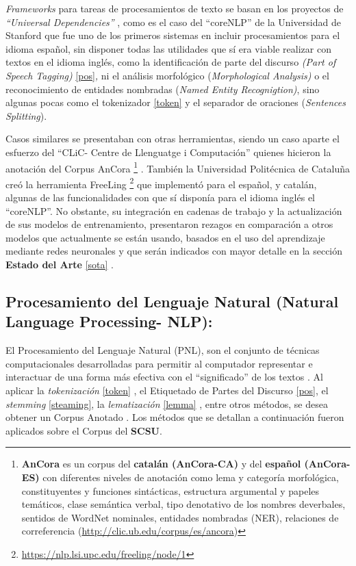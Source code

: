 \documentclass[
  12pt,
  openany]{book}
\begin{document}
\emph{Frameworks} para tareas de procesamientos de texto se basan en los proyectos de \emph{``Universal Dependencies''} \citep{demarneffe2021}, como es el caso del ``coreNLP'' de la Universidad de Stanford \citep{manning-etal-2014-stanford} que fue uno de los primeros sistemas en incluir procesamientos para el idioma español, sin disponer todas las utilidades que sí era viable realizar con textos en el idioma inglés, como la identificación de parte del discurso \emph{(Part of Speech Tagging)} \ref{pos}\emph{,} ni el análisis morfológico (\emph{Morphological Analysis)} \citep{straka2017} o el reconocimiento de entidades nombradas (\emph{Named Entity Recognigtion)}, sino algunas pocas como el tokenizador \ref{token} y el separador de oraciones (\emph{Sentences Splitting}).

Casos similares se presentaban con otras herramientas, siendo un caso aparte el esfuerzo del ``CLiC- Centre de Llenguatge i Computación'' quienes hicieron la anotación del Corpus AnCora \footnote{\textbf{AnCora} es un corpus del \textbf{catalán (AnCora-CA)} y del \textbf{español (AnCora-ES)} con diferentes niveles de anotación como lema y categoría morfológica, constituyentes y funciones sintácticas, estructura argumental y papeles temáticos, clase semántica verbal, tipo denotativo de los nombres deverbales, sentidos de WordNet nominales, entidades nombradas (NER), relaciones de correferencia (\url{http://clic.ub.edu/corpus/es/ancora})} . También la Universidad Politécnica de Cataluña creó la herramienta FreeLing \footnote{\url{https://nlp.lsi.upc.edu/freeling/node/1}} que implementó para el español, y catalán, algunas de las funcionalidades con que sí disponía para el idioma inglés el ``coreNLP''. No obstante, su integración en cadenas de trabajo y la actualización de sus modelos de entrenamiento, presentaron rezagos en comparación a otros modelos que actualmente se están usando, basados en el uso del aprendizaje mediante redes neuronales \citep{chen2014fast} y que serán indicados con mayor detalle en la sección \textbf{Estado del Arte} \ref{sota} .

\hypertarget{nlproc}{%
\subsection{Procesamiento del Lenguaje Natural (Natural Language Processing- NLP):}\label{nlproc}}

El Procesamiento del Lenguaje Natural (PNL), son el conjunto de técnicas computacionales desarrolladas para permitir al computador representar e interactuar de una forma más efectiva con el ``significado'' de los textos . Al aplicar la \emph{tokenización} \ref{token} , el Etiquetado de Partes del Discurso \ref{pos}, el \emph{stemming} \ref{steaming}, la \emph{lematización} \ref{lemma} , entre otros métodos, se desea obtener un Corpus Anotado \citep{desagulier2017}. Los métodos que se detallan a continuación fueron aplicados sobre el Corpus del \textbf{SCSU}.
\end{document}
